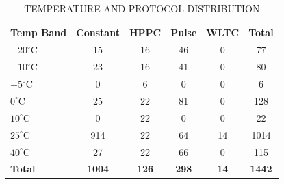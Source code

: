 \begin{table}[H]
    \caption{TEMPERATURE AND PROTOCOL DISTRIBUTION}
    \label{tab:temp_protocol_matrix}
    \begin{center}
        \footnotesize
        \begin{tabular}{lccccc}
            \hline
            \textbf{Temp Band} & \textbf{Constant} & \textbf{HPPC} & \textbf{Pulse} & \textbf{WLTC} & \textbf{Total} \\
            \hline
            $-20^{\circ}\text{C}$ & 15 & 16 & 46 & 0 & 77 \\
            $-10^{\circ}\text{C}$ & 23 & 16 & 41 & 0 & 80 \\
            $-5^{\circ}\text{C}$ & 0 & 6 & 0 & 0 & 6 \\
            $0^{\circ}\text{C}$ & 25 & 22 & 81 & 0 & 128 \\
            $10^{\circ}\text{C}$ & 0 & 22 & 0 & 0 & 22 \\
            $25^{\circ}\text{C}$ & 914 & 22 & 64 & 14 & 1014 \\
            $40^{\circ}\text{C}$ & 27 & 22 & 66 & 0 & 115 \\
            \hline
            \textbf{Total} & \textbf{1004} & \textbf{126} & \textbf{298} & \textbf{14} & \textbf{1442} \\
            \hline
        \end{tabular}
    \end{center}
\end{table}
